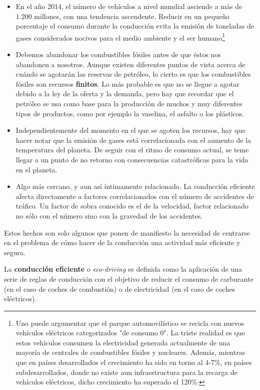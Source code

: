 \begin{itemize}
	\item En el año 2014, el número de vehículos a nivel mundial asciende a más de $1.200$ millones\cite{oica2014motrate}, con una tendencia ascendente. Reducir en un pequeño porcentaje el consumo durante la conducción evita la emisión de toneladas de gases considerados nocivos para el medio ambiente y el ser humano\footnote{Uno puede argumentar que el parque automovilístico se recicla con nuevos vehículos eléctricos categorizados "de consumo 0". La triste realidad es que estos vehículos consumen la electricidad generada actualmente de una mayoría de centrales de combustibles fósiles y nucleares. Además, mientras que en países desarrollados el crecimiento ha sido en torno al 4-7\%, en países subdesarrollados, donde no existe aun infraestructura para la recarga de vehículos eléctricos, dicho crecimiento ha superado el 120\%.}
	\item Debemos abandonar los combustibles fósiles antes de que éstos nos abandonen a nosotros. Aunque existen diferentes puntos de vista acerca de cuándo se agotarán las reservas de petróleo, lo cierto es que los combustibles fósiles son recursos \textbf{finitos}. Lo más probable es que no se llegue a agotar debido a la ley de la oferta y la demanda, pero hay que recordar que el petróleo se usa como base para la producción de muchos y muy diferentes tipos de productos, como por ejemplo la vaselina, el asfalto o los plásticos.
	\item Independientemente del momento en el que se agoten los recursos, hay que hacer notar que la emisión de gases está correlacionada con el aumento de la temperatura del planeta. De seguir con el ritmo de consumo actual, se teme llegar a un punto de no retorno con consecuencias catastróficas para la vida en el planeta.
	\item Algo más cercano, y aun así íntimamente relacionado. La conducción eficiente afecta directamente a factores correlacionados con el número de accidentes de tráfico. Un factor de sobra conocido es el de la velocidad, factor relacionado no sólo con el número sino con la gravedad de los accidentes\cite{imprialou2016re}.
\end{itemize}

Estos hechos son solo algunos que ponen de manifiesto la necesidad de centrarse en el problema de cómo hacer de la conducción una actividad más eficiente y segura.

La \textbf{conducción eficiente} o \textit{eco-driving} es definida como la aplicación de una serie de reglas de conducción con el objetivo de reducir el consumo de carburante (en el caso de coches de combustión) o de electricidad (en el caso de coches eléctricos).

